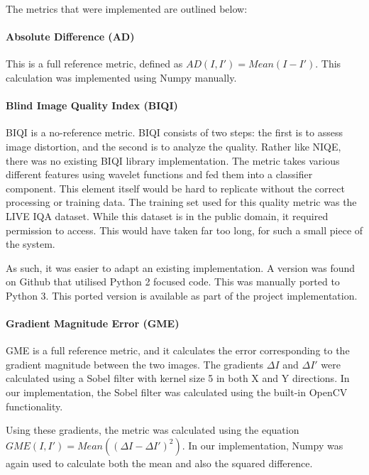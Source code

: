 \documentclass[10pt,a4paper]{article}
\begin{document}
            The metrics that were implemented are outlined below:

            \paragraph{Absolute Difference (AD)}
                This is a full reference metric, defined as $AD(I, I') = Mean(I - I')$. This calculation was implemented using Numpy manually.

            \paragraph{Blind Image Quality Index (BIQI)}
                BIQI is a no-reference metric. BIQI consists of two steps: the first is to assess image distortion, and the second is to analyze the quality.  Rather like NIQE, there was no existing BIQI library implementation. The metric takes various different features using wavelet functions and fed them into a classifier component. This element itself would be hard to replicate without the correct processing or training data. The training set used for this quality metric was the LIVE IQA dataset. While this dataset is in the public domain, it required permission to access. This would have taken far too long, for such a small piece of the system.

                As such, it was easier to adapt an existing implementation. A version was found on Github that utilised Python 2 focused code. This was manually ported to Python 3. \cite{BIQIImplementation} This ported version is available as part of the project implementation.

                
            \paragraph{Gradient Magnitude Error (GME)}
            GME is a full reference metric, and it calculates the error corresponding to the gradient magnitude between the two images. The gradients $\Delta I$ and $\Delta I'$
            were calculated using a Sobel filter with kernel size 5 in both X and Y directions. In our implementation, the Sobel filter was calculated using the built-in OpenCV functionality.

                Using these gradients, the metric was calculated using the equation $GME(I, I') = Mean((\Delta I - \Delta I')^2)$. In our implementation, Numpy was again used to calculate both the mean and
                also the squared difference.
\end{document}
